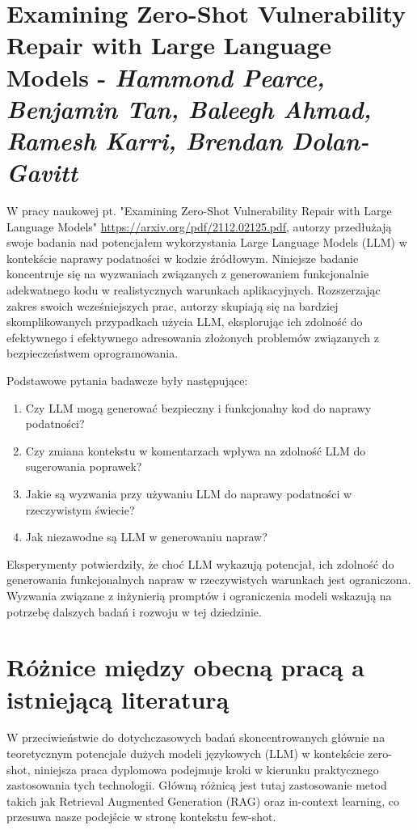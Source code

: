 \section{Examining Zero-Shot Vulnerability Repair with Large Language Models - \scriptsize\textit{Hammond Pearce, Benjamin Tan, Baleegh Ahmad, Ramesh Karri, Brendan Dolan-Gavitt}}


W pracy naukowej pt. "Examining Zero-Shot Vulnerability Repair with Large Language Models"\cite{zero-shot-vuln-repair} \url{https://arxiv.org/pdf/2112.02125.pdf}, autorzy przedłużają swoje badania nad potencjałem wykorzystania Large Language Models (LLM) w kontekście naprawy podatności w kodzie źródłowym. Niniejsze badanie koncentruje się na wyzwaniach związanych z generowaniem funkcjonalnie adekwatnego kodu w realistycznych warunkach aplikacyjnych. Rozszerzając zakres swoich wcześniejszych prac, autorzy skupiają się na bardziej skomplikowanych przypadkach użycia LLM, eksplorując ich zdolność do efektywnego i efektywnego adresowania złożonych problemów związanych z bezpieczeństwem oprogramowania.

Podstawowe pytania badawcze były następujące:
\begin{enumerate}
    \item Czy LLM mogą generować bezpieczny i funkcjonalny kod do naprawy podatności?
    \item Czy zmiana kontekstu w komentarzach wpływa na zdolność LLM do sugerowania poprawek?
    \item Jakie są wyzwania przy używaniu LLM do naprawy podatności w rzeczywistym świecie?
    \item Jak niezawodne są LLM w generowaniu napraw?
\end{enumerate}

Eksperymenty potwierdziły, że choć LLM wykazują potencjał, ich zdolność do generowania funkcjonalnych napraw w rzeczywistych warunkach jest ograniczona. Wyzwania związane z inżynierią promptów i ograniczenia modeli wskazują na potrzebę dalszych badań i rozwoju w tej dziedzinie.

\section{Różnice między obecną pracą a istniejącą literaturą}

W przeciwieństwie do dotychczasowych badań skoncentrowanych głównie na teoretycznym potencjale dużych modeli językowych (LLM) w kontekście zero-shot, niniejsza praca dyplomowa podejmuje kroki w kierunku praktycznego zastosowania tych technologii. Główną różnicą jest tutaj zastosowanie metod takich jak Retrieval Augmented Generation (RAG) oraz in-context learning, co przesuwa nasze podejście w stronę kontekstu few-shot. 


